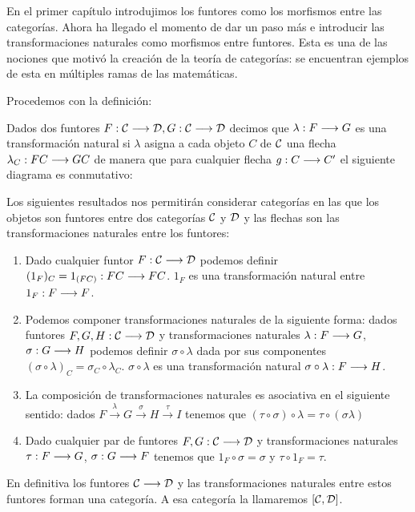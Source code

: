 En el primer capítulo introdujimos los funtores como los morfismos
entre las categorías. Ahora ha llegado el momento de dar un paso más
e introducir las transformaciones naturales como morfismos entre
funtores. Esta es una de las nociones que motivó la creación de la
teoría de categorías: se encuentran ejemplos de esta en múltiples
ramas de las matemáticas.

Procedemos con la definición:

\begin{definition}
  Dados dos funtores $F: \mathcal{C}\longrightarrow \mathcal{D}, G : \mathcal{C}\longrightarrow \mathcal{D}$ decimos
  que $\lambda : F\longrightarrow G$ es una transformación natural si $\lambda$
  asigna a cada objeto $C$ de $\mathcal{C}$ una flecha
  $\lambda_C : FC\longrightarrow GC$ de manera que para
  cualquier flecha $g : C\longrightarrow C'$ el siguiente diagrama
  es conmutativo:


  \begin{center}
  \end{center}
\end{definition}

Los siguientes resultados nos permitirán considerar categorías en las
que los objetos son funtores entre dos categorías $\mathcal{C}$ y $\mathcal{D}$ y las
flechas son las transformaciones naturales entre los funtores:

\begin{proposition}
  \begin{enumerate}
  \item Dado cualquier funtor $F : \mathcal{C}\longrightarrow \mathcal{D}$ podemos definir
    $({1_F})_C  = 1_{(FC)} : FC\longrightarrow FC$. $1_F$ es una transformación
    natural entre $1_F : F\longrightarrow F$.
  \item Podemos componer transformaciones naturales de la siguiente
    forma: dados funtores $F, G, H : \mathcal{C}\longrightarrow \mathcal{D}$ y transformaciones
    naturales $\lambda : F\longrightarrow G$, $\sigma : G\longrightarrow H$ podemos
    definir $\sigma \circ \lambda$ dada
    por sus componentes
    $(\sigma\circ\lambda)_C = \sigma_C \circ \lambda_C$.
    $\sigma\circ\lambda$ es una transformación natural
    $\sigma\circ\lambda : F\longrightarrow H$.
  \item La composición de transformaciones naturales
    es asociativa en el siguiente sentido: dados
    $F \xrightarrow{\lambda} G \xrightarrow{\sigma} H \xrightarrow{\tau}I$
    tenemos que $(\tau \circ \sigma) \circ \lambda = \tau \circ (\sigma \lambda)$
  \item Dado cualquier par de funtores $F,G : \mathcal{C}\longrightarrow \mathcal{D}$ y
    transformaciones naturales $\tau : F\longrightarrow G$,
    $\sigma : G\longrightarrow F$ tenemos que $1_F \circ \sigma = \sigma$
    y $\tau \circ 1_F = \tau$.
  \end{enumerate}

  En definitiva los funtores $\mathcal{C}\longrightarrow \mathcal{D}$ y las transformaciones
  naturales entre estos funtores forman una categoría. A esa categoría
  la llamaremos $[\mathcal{C}, \mathcal{D}]$.
\end{proposition}

